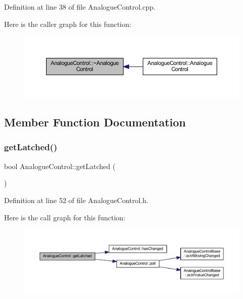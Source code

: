 Definition at line 38 of file Analogue\+Control.\+cpp.

Here is the caller graph for this function\+:
\nopagebreak
\begin{figure}[H]
\begin{center}
\leavevmode
\includegraphics[width=350pt]{class_analogue_control_a08a12843e8a0a1cb8a0ef9da3865a453_icgraph}
\end{center}
\end{figure}


\subsection{Member Function Documentation}
\mbox{\label{class_analogue_control_a0fd8ee45aa916be0b7ba0bdccab41033}} 
\subsubsection{\texorpdfstring{get\+Latched()}{getLatched()}}
{\footnotesize\ttfamily bool Analogue\+Control\+::get\+Latched (\begin{DoxyParamCaption}{ }\end{DoxyParamCaption})\hspace{0.3cm}{\ttfamily [inline]}}



Definition at line 52 of file Analogue\+Control.\+h.

Here is the call graph for this function\+:
\nopagebreak
\begin{figure}[H]
\begin{center}
\leavevmode
\includegraphics[width=350pt]{class_analogue_control_a0fd8ee45aa916be0b7ba0bdccab41033_cgraph}
\end{center}
\end{figure}
\mbox{\label{class_analogue_control_a69b90c306b7831a3addb30b6683ec171}} 
